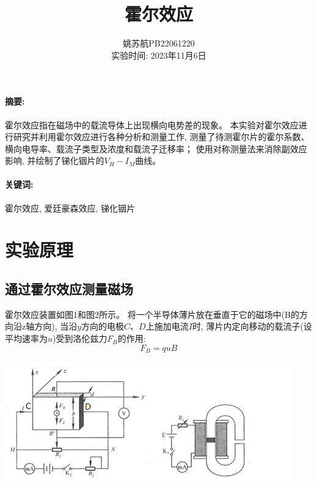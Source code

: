 \documentclass[a4paper]{article}
\title{\textbf{霍尔效应}}
\author{姚苏航\quad PB22061220\\实验时间: 2023年11月6日}
\date{}
\begin{document}
    \maketitle

    \paragraph{摘要:}
    {
        霍尔效应指在磁场中的载流导体上出现横向电势差的现象。
        本实验对霍尔效应进行研究并利用霍尔效应进行各种分析和测量工作,
        测量了待测霍尔片的霍尔系数、横向电导率、载流子类型及浓度和载流子迁移率；
        使用对称测量法来消除副效应影响, 并绘制了锑化铟片的$V_H-I_M$曲线。
    }

    \paragraph{关键词:}
    {
        霍尔效应, 爱廷豪森效应, 锑化铟片
    }

    \vspace{1cm}


    \section{实验原理}\label{sec:3}

    \subsection{通过霍尔效应测量磁场}

    {
        霍尔效应装置如图1和图2所示。
        将一个半导体薄片放在垂直于它的磁场中(B的方向沿z轴方向),
        当沿$y$方向的电极$C$、$D$上施加电流$I$时,
        薄片内定向移动的载流子(设平均速率为$u$)受到洛伦兹力$F_B$的作用:
        \begin{equation}
            F_B=quB\label{eq:equation}
        \end{equation}
    }\label{subsec:7}

    \includegraphics[height=0.255\textheight]{1_2}
\end{document}
